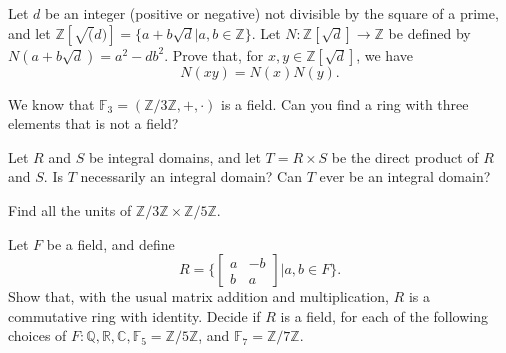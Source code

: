 \documentclass[12pt,letterpaper,boxed]{hmcpset}
\begin{document}

\begin{problem}[15.1.3]
Let $d$ be an integer (positive or negative) not divisible by the square of a prime, and let $\mathbb{Z}[\sqrt(d)] = \{ a+b\sqrt{d} \vert a,b \in \mathbb{Z} \}$. Let $N : \mathbb{Z}[\sqrt{d}] \rightarrow \mathbb{Z}$ be defined by $N(a + b\sqrt{d}) = a^2 - db^2$. Prove that, for $x,y \in \mathbb{Z}[\sqrt{d}]$, we have $$N(xy) = N(x)N(y).$$
\end{problem}

\begin{solution}
\end{solution}

\clearpage

\begin{problem}[15.2.1]
We know that $\mathbb{F}_3 = (\mathbb{Z}/3\mathbb{Z},+,\cdot)$ is a field. Can you find a ring with three elements that is not a field?
\end{problem}

\begin{solution}
\end{solution}

\clearpage

\begin{problem}[15.2.4]
Let $R$ and $S$ be integral domains, and let $T = R \times S$ be the direct product of $R$ and $S$. Is $T$ necessarily an integral domain? Can $T$ ever be an integral domain?
\end{problem}

\begin{solution}
\end{solution}

\clearpage

\begin{problem}[15.2.5]
Find all the units of $\mathbb{Z}/3\mathbb{Z} \times \mathbb{Z}/5\mathbb{Z}$. 
\end{problem}

\begin{solution}
\end{solution}

\clearpage

\begin{problem}[15.2.12]
Let $F$ be a field, and define
$$ R = \{ 
\begin{bmatrix}
a & -b \\
b & a
\end{bmatrix}
\vert a,b \in F
\}.$$
Show that, with the usual matrix addition and multiplication, $R$ is a commutative ring with identity. Decide if $R$ is a field, for each of the following choices of $F: \mathbb{Q}, \mathbb{R}, \mathbb{C}, \mathbb{F}_5 = \mathbb{Z}/5\mathbb{Z}$, and $\mathbb{F}_7 = \mathbb{Z}/7\mathbb{Z}$. 
\end{problem}

\begin{solution}

\end{solution}
\end{document}
